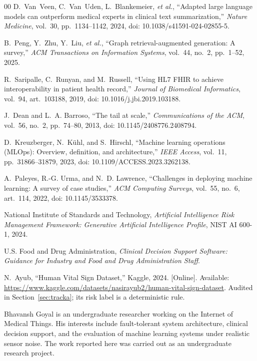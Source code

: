 \documentclass[lettersize,journal]{IEEEtran}
\begin{document}
\begin{thebibliography}{00}
D.~Van~Veen, C.~Van~Uden, L.~Blankemeier, \emph{et al.}, ``Adapted large
language models can outperform medical experts in clinical text
summarization,'' \emph{Nature Medicine}, vol.~30, pp.~1134--1142, 2024, doi:
10.1038/s41591-024-02855-5.

B.~Peng, Y.~Zhu, Y.~Liu, \emph{et al.}, ``Graph retrieval-augmented generation:
A survey,'' \emph{ACM Transactions on Information Systems}, vol.~44, no.~2,
pp.~1--52, 2025.

R.~Saripalle, C.~Runyan, and M.~Russell, ``Using HL7 FHIR to achieve
interoperability in patient health record,'' \emph{Journal of Biomedical
Informatics}, vol.~94, art.~103188, 2019, doi: 10.1016/j.jbi.2019.103188.

J.~Dean and L.~A. Barroso, ``The tail at scale,'' \emph{Communications of the
ACM}, vol.~56, no.~2, pp.~74--80, 2013, doi: 10.1145/2408776.2408794.

D.~Kreuzberger, N.~K\"{u}hl, and S.~Hirschl, ``Machine learning operations
(MLOps): Overview, definition, and architecture,'' \emph{IEEE Access}, vol.~11,
pp.~31866--31879, 2023, doi: 10.1109/ACCESS.2023.3262138.

A.~Paleyes, R.-G. Urma, and N.~D. Lawrence, ``Challenges in deploying machine
learning: A survey of case studies,'' \emph{ACM Computing Surveys}, vol.~55,
no.~6, art.~114, 2022, doi: 10.1145/3533378.

National Institute of Standards and Technology, \emph{Artificial Intelligence
Risk Management Framework: Generative Artificial Intelligence Profile},
NIST AI 600-1, 2024.

U.S. Food and Drug Administration, \emph{Clinical Decision Support Software:
Guidance for Industry and Food and Drug Administration Staff}.

N.~Ayub, ``Human Vital Sign Dataset,'' Kaggle, 2024. [Online]. Available:
\url{https://www.kaggle.com/datasets/nasirayub2/human-vital-sign-dataset}.
Audited in Section~\ref{sec:tracka}; its risk label is a deterministic rule.

\end{thebibliography}

\begin{IEEEbiographynophoto}{Bhavansh Goyal}
is an undergraduate researcher working on the Internet of Medical Things. His
interests include fault-tolerant system architecture, clinical decision
support, and the evaluation of machine learning systems under realistic sensor
noise. The work reported here was carried out as an undergraduate research
project.
\end{IEEEbiographynophoto}
\end{document}
